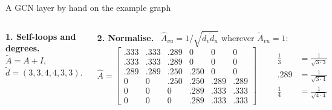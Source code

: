 \documentclass[aspectratio=169,10pt]{beamer}
\newcommand{\Ah}{\hat A}
\newcommand{\At}{\tilde A}
\newcommand{\dt}{\tilde d}
\begin{document}
\begin{frame}{A GCN layer by hand on the example graph}
\begin{columns}[T,onlytextwidth]
\small
\textbf{1. Self-loops and degrees.} \ $\At=A+I$, \ $\dt=(3,3,4,4,3,3)$.

\vspace{1mm}
\textbf{2. Normalise.} \ $\Ah_{vu}=1/\sqrt{\dt_v\dt_u}$ wherever $\At_{vu}=1$:
{\scriptsize
\[
 \Ah=\begin{bmatrix}
 .333&.333&.289&0&0&0\\ .333&.333&.289&0&0&0\\ \mathbf{.289}&\mathbf{.289}&\mathbf{.250}&\mathbf{.250}&0&0\\
 0&0&.250&.250&.289&.289\\ 0&0&0&.289&.333&.333\\ 0&0&0&.289&.333&.333
 \end{bmatrix}
 \qquad
 \begin{aligned}
  \tfrac13&=\tfrac1{\sqrt{3\cdot3}}\\[1pt] .289&=\tfrac1{\sqrt{3\cdot4}}\\[1pt] \tfrac14&=\tfrac1{\sqrt{4\cdot4}}
 \end{aligned}
\]}
\vspace{-2mm}


\end{columns}
\end{frame}
\end{document}
